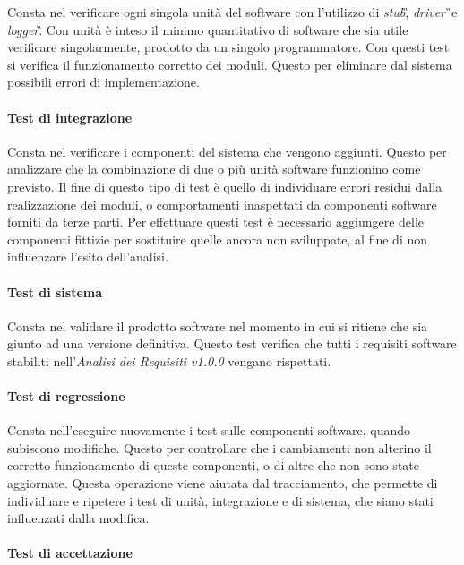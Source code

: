 Consta nel verificare ogni singola unità del software con l'utilizzo di 
\textit{stub}\G, \textit{driver}\G\ e \textit{logger}\G.
Con unità è inteso il minimo quantitativo di software che sia utile verificare 
singolarmente, prodotto da un singolo programmatore. Con questi test si 
verifica il funzionamento corretto dei moduli. Questo per eliminare dal sistema 
possibili errori di implementazione.

\paragraph{Test di integrazione}

Consta nel verificare i componenti del sistema che vengono aggiunti. Questo per 
analizzare che la combinazione di due o più unità software funzionino come 
previsto.
Il fine di questo tipo di test è quello di individuare errori residui dalla 
realizzazione dei moduli, o comportamenti inaspettati da componenti software 
forniti da terze parti. Per effettuare questi test è necessario aggiungere 
delle componenti fittizie per sostituire quelle ancora non sviluppate, al fine 
di non influenzare l'esito dell'analisi.

\paragraph{Test di sistema}

Consta nel validare il prodotto software nel momento in cui si ritiene che sia 
giunto ad una versione definitiva. Questo test verifica che tutti i requisiti 
software stabiliti nell'\textit{Analisi dei Requisiti v1.0.0} vengano 
rispettati.

\paragraph{Test di regressione}

Consta nell'eseguire nuovamente i test sulle componenti software, quando 
subiscono modifiche. Questo per controllare che i cambiamenti non alterino il 
corretto funzionamento di queste componenti, o di altre che non sono state 
aggiornate.
Questa operazione viene aiutata dal tracciamento, che permette di individuare e ripetere i test di unità, integrazione e di sistema, che siano stati influenzati dalla modifica.

\paragraph{Test di accettazione}

